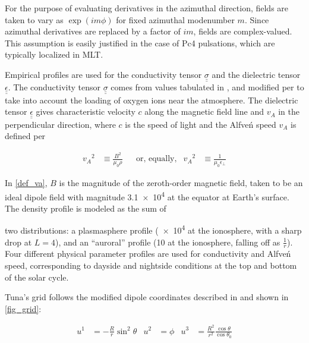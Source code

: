 \documentclass[draft,linenumbers]{agujournal}
\begin{document}
For the purpose of evaluating derivatives in the azimuthal direction, fields are taken to vary as $\exp \left(i m \phi\right)$ for fixed azimuthal modenumber $m$. Since azimuthal derivatives are replaced by a factor of $i m$, fields are complex-valued. This assumption is easily justified in the case of Pc4 pulsations, which are typically localized in MLT\citep{anderson_1990,dai_2015,engebretson_1992,liu_2009}.


Empirical profiles are used for the conductivity tensor $\underline{\underline{\sigma}}$ and the dielectric tensor $\underline{\underline{\epsilon}}$. The conductivity tensor $\underline{\underline{\sigma}}$ comes from values tabulated in \citet{kelley_1989}, and modified per \citet{lysak_2013} to take into account the loading of oxygen ions near the atmosphere. The dielectric tensor $\underline{\underline{\epsilon}}$ gives characteristic velocity $c$ along the magnetic field line and $v_A$ in the perpendicular direction, where $c$ is the speed of light and the Alfve\'n speed $v_A$ is defined per

\begin{linenomath*}
\begin{align}
    \label{def_va}
    {v_A}^2 &\equiv \frac{B^2}{\mu_0\rho} &
    & \text{or, equally,} &
    {v_A}^2 &\equiv \frac{1}{\mu_0\epsilon_\bot}
\end{align}
\end{linenomath*}

In \cref{def_va}, $B$ is the magnitude of the zeroth-order magnetic field, taken to be an ideal dipole field with magnitude \SI{3.1e4}{\nT} at the equator at Earth's surface. The density profile is modeled as the sum of

two distributions: a plasmasphere profile (\SI{e4}{\percc} at the ionosphere, with a sharp drop at $L = 4$), and an ``auroral'' profile (\SI{10}{\percc} at the ionosphere, falling off as $\frac{1}{r}$). Four different physical parameter profiles are used for conductivity and Alfve\'n speed, corresponding to dayside and nightside conditions at the top and bottom of the solar cycle.


Tuna's grid follows the modified dipole coordinates described in \citet{lysak_2004} and shown in \cref{fig_grid}:
\begin{linenomath*}
\begin{align}
  \label{def_coords}
  u^1 & = - \frac{R}{r} \sin^2 \theta &
  u^2 & = \phi &
  u^3 & = \frac{R^2}{r^2} \frac{\cos \theta}{\cos \theta_0}
\end{align}
\end{linenomath*}
\end{document}
